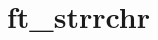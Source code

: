 \chapter{ft\+\_\+strrchr}
\hypertarget{md_Documentation_2ft__strrchr}{}\label{md_Documentation_2ft__strrchr}
